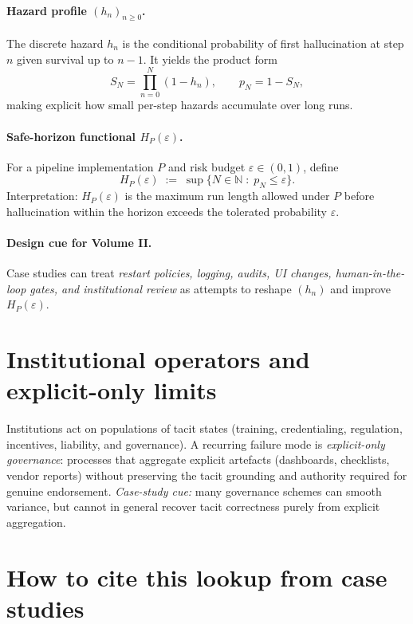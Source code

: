 \paragraph{Hazard profile $(h_n)_{n\ge 0}$.}
The discrete hazard $h_n$ is the conditional probability of first hallucination at step $n$
given survival up to $n-1$. It yields the product form
\[
S_N = \prod_{n=0}^{N} (1 - h_n),
\qquad
p_N = 1 - S_N,
\]
making explicit how small per-step hazards accumulate over long runs.

\paragraph{Safe-horizon functional $H_{P}(\varepsilon)$.}
For a pipeline implementation $P$ and risk budget $\varepsilon \in (0,1)$, define
\[
H_{P}(\varepsilon)
\;:=\;
\sup\{N \in \mathbb{N} \;:\; p_N \le \varepsilon\}.
\]
Interpretation: $H_{P}(\varepsilon)$ is the maximum run length allowed under $P$ before hallucination
within the horizon exceeds the tolerated probability $\varepsilon$.

\paragraph{Design cue for Volume II.}
Case studies can treat \emph{restart policies, logging, audits, UI changes, human-in-the-loop gates,
and institutional review} as attempts to reshape $(h_n)$ and improve $H_{P}(\varepsilon)$.

\section{Institutional operators and explicit-only limits}
\label{sec:lookup-institutions}

Institutions act on populations of tacit states (training, credentialing, regulation, incentives,
liability, and governance). A recurring failure mode is \emph{explicit-only governance}:
processes that aggregate explicit artefacts (dashboards, checklists, vendor reports) without preserving
the tacit grounding and authority required for genuine endorsement.
\emph{Case-study cue:} many governance schemes can smooth variance, but cannot in general recover tacit
correctness purely from explicit aggregation.

\section{How to cite this lookup from case studies}
\label{sec:lookup-cite}

